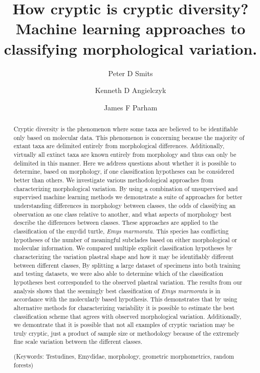 \documentclass[12pt,letterpaper]{article}\usepackage{graphicx, color}
\title{How cryptic is cryptic diversity? Machine learning approaches to classifying morphological variation.}
\author[1]{Peter D Smits}%
\author[2]{Kenneth D Angielczyk}%
\author[3]{James F Parham}%
\affil[1]{Committee on Evolutionary Biology, University of Chicago}
\affil[2]{Department of Geology, Field Museum of Natural History}
\affil[3]{Department of Geological Sciences, California State University -- Fullerton}
\begin{document}
\maketitle
{}


\begin{abstract}
  Cryptic diversity is the phenomenon where some taxa are believed to be identifiable only based on molecular data. This phenomenon is concerning because the majority of extant taxa are delimited entirely from morphological differences. Additionally, virtually all extinct taxa are known entirely from morphology and thus can only be delimited in this manner. Here we address questions about whether it is possible to determine, based on morphology, if one classification hypotheses can be considered better than others. We investigate various methodological approaches from characterizing morphological variation.
  By using a combination of unsupervised and supervised machine learning methods we demonstrate a suite of approaches for better understanding differences in morphology between classes, the odds of classifying an observation as one class relative to another, and what aspects of morphology best describe the differences between classes.
  These approaches are applied to the classification of the emydid turtle, \textit{Emys marmorata}. This species has conflicting hypotheses of the number of meaningful subclades based on either morphological or molecular information. We compared multiple explicit classification hypotheses by characterizing the variation plastral shape and how it may be identifiably different between different classes, By splitting a large dataset of specimens into both training and testing datasets, we were also able to determine which of the classification hypotheses best corresponded to the observed plastral variation.
  The results from our analysis shows that the seemingly best classification of \textit{Emys marmorata} is in accordance with the molecularly based hypothesis. This demonstrates that by using alternative methods for characterizing variability it is possible to estimate the best classification scheme that agrees with observed morphological variation. Additionally, we demontrate that it is possible that not all examples of cryptic variation may be truly cryptic, just a product of sample size or methodology because of the extremely fine scale variation between the different classes.
 
\noindent (Keywords: Testudines, Emydidae, morphology, geometric morphometrics, random forests)
\end{abstract}
\end{document}
